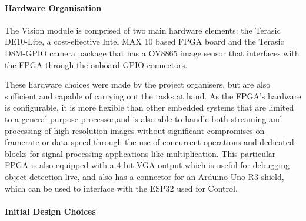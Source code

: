 \documentclass[a4paper]{article}
\begin{document}
\paragraph*{Hardware Organisation}

The Vision module is comprised of two main hardware elements: 
    the Terasic DE10-Lite, a cost-effective Intel MAX 10 based FPGA board 
    \cite{TerasicDE10Web} 
    and the Terasic D8M-GPIO camera package that has a OV8865 image sensor \cite{TerasicD8MWeb}
that interfaces with the FPGA through the onboard GPIO connectors. 

These hardware choices were made by the project organisers, 
but are also sufficient and capable of carrying out the tasks at hand. 
As the FPGA's hardware is configurable, 
it is more flexible than other embedded systems 
that are limited to a general purpose processor,and 
is also able to handle both streaming and processing of high resolution images
without significant compromises on framerate or data speed 
through the use of concurrent operations and dedicated blocks 
for signal processing applications like multiplication.
This particular FPGA is also equipped with a 4-bit VGA output 
which is useful for debugging object detection live, 
and also has a connector for an Arduino Uno R3 shield, \cite{TerasicDE10Web} 
which can be used to interface with the ESP32 used for Control.  


\paragraph*{Initial Design Choices}
\end{document}
